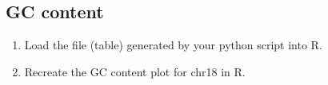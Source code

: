 \documentclass[a4paper,11pt]{article}
\begin{document}
\subsection{GC content}
\begin{enumerate}
\item Load the file (table) generated by your python script into R.
\item Recreate the GC content plot for chr18 in R.
\end{enumerate}
\end{document}
